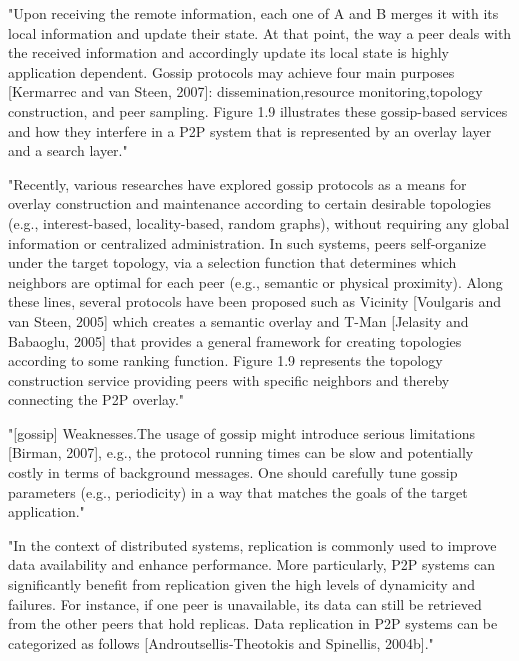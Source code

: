 "Upon receiving the remote information, each one of A and B merges it with its local information and update their state.
At that point, the way a peer deals with the received information and accordingly update its local state is highly application dependent.
Gossip protocols may achieve four main purposes [Kermarrec and van Steen, 2007]: dissemination,resource monitoring,topology construction, and peer sampling.
Figure 1.9 illustrates these gossip-based services and how they interfere in a P2P system that is represented by an overlay layer and a search layer."\cite{book:p2p-mob}

"Recently, various researches have explored gossip protocols as a means for overlay construction and maintenance according to certain desirable topologies (e.g., interest-based, locality-based, random graphs), without requiring any global information or centralized administration.
In such systems, peers self-organize under the target topology, via a selection function that determines which neighbors are optimal for each peer (e.g., semantic or physical proximity).
Along these lines, several protocols have been proposed such as Vicinity [Voulgaris and van Steen, 2005] which creates a semantic overlay and T-Man [Jelasity and Babaoglu, 2005] that provides a general framework for creating topologies according to some ranking function.
Figure 1.9 represents the topology construction service providing peers with specific neighbors and thereby connecting the P2P overlay."\cite{book:p2p-mob}

"[gossip] Weaknesses.The usage of gossip might introduce serious limitations [Birman, 2007], e.g., the protocol running times can be slow and potentially costly in terms of background messages.
One should carefully tune gossip parameters (e.g., periodicity) in a way that matches the goals of the target application."\cite{book:p2p-mob}

"In the context of distributed systems, replication is commonly used to improve data availability and enhance performance.
More particularly, P2P systems can significantly benefit from replication given the high levels of dynamicity and failures.
For instance, if one peer is unavailable, its data can still be retrieved from the other peers that hold replicas.
Data replication in P2P systems can be categorized as follows [Androutsellis-Theotokis and Spinellis, 2004b]."\cite{book:p2p-mob}

